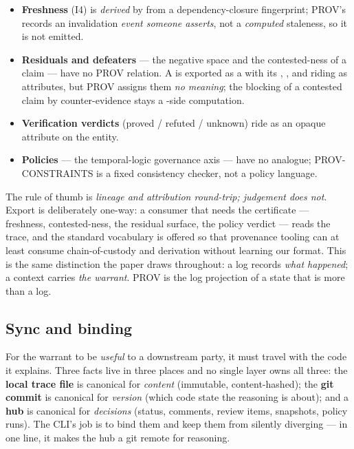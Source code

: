 \begin{itemize}
\item \textbf{Freshness} (I4) is \emph{derived} by  from a dependency-closure fingerprint; PROV's
 records an invalidation \emph{event someone asserts}, not a \emph{computed} staleness,
so it is not emitted.
\item \textbf{Residuals and defeaters} --- the negative space and the contested-ness of a claim --- have no
PROV relation. A  is exported as a  with its , ,
and  riding as  attributes, but PROV assigns them \emph{no meaning}; the blocking of
a contested claim by counter-evidence stays a -side computation.
\item \textbf{Verification verdicts} (proved / refuted / unknown) ride as an opaque 
attribute on the entity.
\item \textbf{Policies} --- the temporal-logic governance axis --- have no analogue; PROV-CONSTRAINTS is a
fixed consistency checker, not a policy language.
\end{itemize}

The rule of thumb is \emph{lineage and attribution round-trip; judgement does not}. Export is deliberately
one-way: a consumer that needs the certificate --- freshness, contested-ness, the residual surface, the
policy verdict --- reads the  trace, and the standard vocabulary is offered so that provenance
tooling can at least consume chain-of-custody and derivation without learning our format. This is the same
distinction the paper draws throughout: a log records \emph{what happened}; a context carries \emph{the
warrant}. PROV is the log projection of a state that is more than a log.

\subsection{Sync and binding}\label{sec:interchange-sync}

For the warrant to be \emph{useful} to a downstream party, it must travel with the code it explains. Three
facts live in three places and no single layer owns all three: the \textbf{local trace file} is canonical for
\emph{content} (immutable, content-hashed); the \textbf{git commit} is canonical for \emph{version} (which
code state the reasoning is about); and a \textbf{hub} is canonical for \emph{decisions} (status, comments,
review items, snapshots, policy runs). The CLI's job is to bind them and keep them from silently diverging ---
in one line, it makes the hub a git remote for reasoning.

